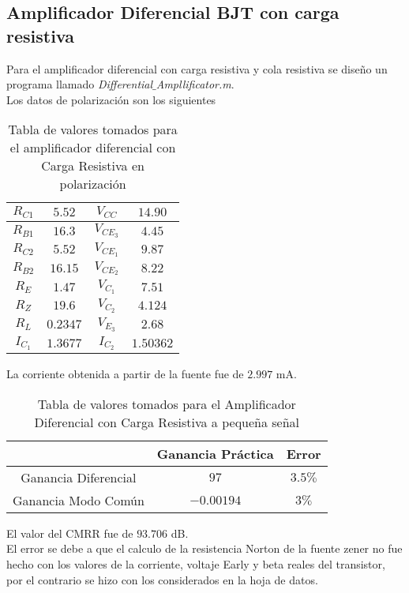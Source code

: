 \documentclass[11pt,graphicx,caption,rotating]{article}
\begin{document}
\subsection{Amplificador Diferencial BJT con carga resistiva}
\noindent
Para el amplificador diferencial con carga resistiva y cola resistiva se diseño un programa llamado \textit{Differential$\_$Ampllificator.m}.\\
Los datos de polarización son los siguientes
\begin{table}[H]
	\centering
\begin{tabular}[c]{|c|c||c|c|} \hline
$R_{C1}$ & $5.52$ & $V_{CC}$ & $14.90$ \\ \hline
$R_{B1}$ & $16.3$ & $V_{CE_{3}}$ & $4.45$ \\ \hline
$R_{C2}$ & $5.52$ & $V_{CE_{1}}$ & $9.87$ \\ \hline
$R_{B2}$ & $16.15$ & $V_{CE_{2}}$ & $8.22$ \\ \hline
$R_{E}$ & $1.47$ & $V_{C_{1}}$ & $7.51$ \\ \hline
$R_{Z}$ & $19.6$ & $V_{C_{2}}$ & $4.124$ \\ \hline
$R_{L}$ & $0.2347$ & $V_{E_{3}}$ & $2.68$ \\ \hline
$I_{C_{1}}$ & $1.3677$ & $I_{C_{2}}$ & $1.50362$ \\ \hline
\end{tabular}
	\caption{Tabla de valores tomados para el amplificador diferencial con Carga Resistiva en polarización}
	\label{tab17}
\end{table}
\noindent
La corriente obtenida a partir de la fuente fue de $2.997$ mA.\\
\begin{table}[H]
	\centering
\begin{tabular}[c]{|c|c|c|} \hline
 & Ganancia Práctica & Error \\ \hline
Ganancia Diferencial & $97$ & $3.5\%$ \\ \hline
Ganancia Modo Común & $-0.00194$ & $3\%$ \\ \hline
\end{tabular}
	\caption{Tabla de valores tomados para el Amplificador Diferencial con Carga Resistiva a pequeña señal}
	\label{tab18}
\end{table}
\noindent
El valor del CMRR fue de $93.706$ dB.\\
El error se debe a que el calculo de la resistencia Norton de la fuente zener no fue hecho con los valores de la corriente, voltaje Early y beta reales del transistor, por el contrario se hizo con los considerados en la hoja de datos.
\end{document}

